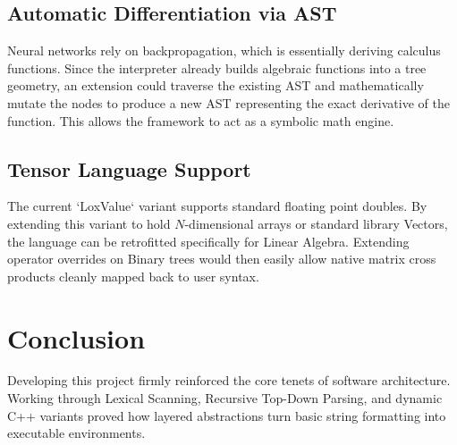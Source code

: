 \documentclass[12pt,a4paper,oneside]{report}
\begin{document}
\section{Automatic Differentiation via AST}
Neural networks rely on backpropagation, which is essentially deriving calculus functions. Since the interpreter already builds algebraic functions into a tree geometry, an extension could traverse the existing AST and mathematically mutate the nodes to produce a new AST representing the exact derivative of the function. This allows the framework to act as a symbolic math engine.

\section{Tensor Language Support}
The current `LoxValue` variant supports standard floating point doubles. By extending this variant to hold $N$-dimensional arrays or standard library Vectors, the language can be retrofitted specifically for Linear Algebra. Extending operator overrides on Binary trees would then easily allow native matrix cross products cleanly mapped back to user syntax. 

\chapter{Conclusion}
Developing this project firmly reinforced the core tenets of software architecture. Working through Lexical Scanning, Recursive Top-Down Parsing, and dynamic C++ variants proved how layered abstractions turn basic string formatting into executable environments. 
\end{document}
